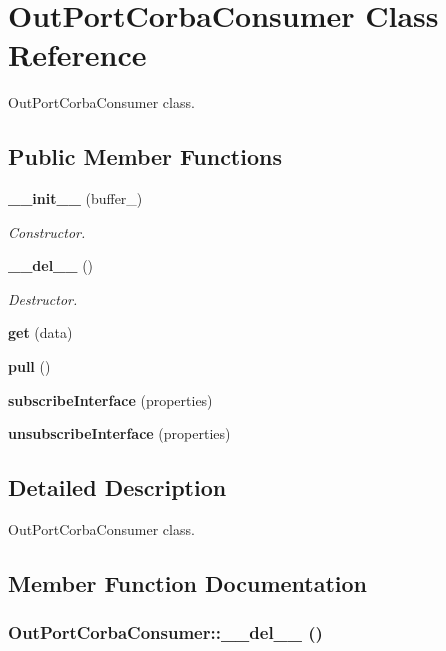 \section{Out\-Port\-Corba\-Consumer Class Reference}
\label{classOutPortCorbaConsumer}
Out\-Port\-Corba\-Consumer class.  


\subsection*{Public Member Functions}
\begin{CompactItemize}
\item 
{\bf \_\-\_\-init\_\-\_\-} (buffer\_\-)
\begin{CompactList}\small\item\em Constructor. \item\end{CompactList}\item 
{\bf \_\-\_\-del\_\-\_\-} ()
\begin{CompactList}\small\item\em Destructor. \item\end{CompactList}\item 
{\bf get} (data)
\item 
{\bf pull} ()
\item 
{\bf subscribe\-Interface} (properties)
\item 
{\bf unsubscribe\-Interface} (properties)
\end{CompactItemize}


\subsection{Detailed Description}
Out\-Port\-Corba\-Consumer class. 



\subsection{Member Function Documentation}
\subsubsection{\setlength{\rightskip}{0pt plus 5cm}Out\-Port\-Corba\-Consumer::\_\-\_\-del\_\-\_\- ()}\label{classOutPortCorbaConsumer_OutPortCorbaConsumera1}


